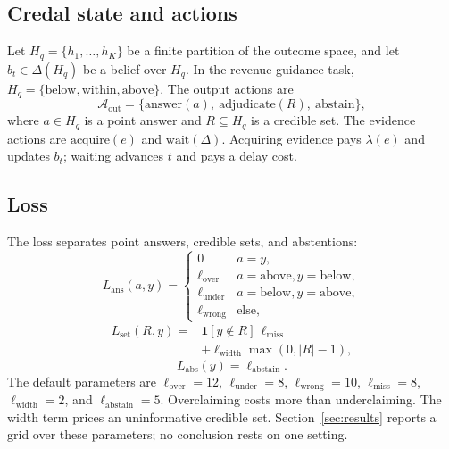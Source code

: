 \documentclass[11pt]{article}
\newcommand{\indic}{\mathbf{1}}
\begin{document}
\subsection{Credal state and actions}
Let $H_q=\{h_1,\dots,h_K\}$ be a finite partition of the outcome space, and let $b_t\in\Delta(H_q)$ be a belief over $H_q$. In the revenue-guidance task, $H_q=\{\text{below},\text{within},\text{above}\}$. The output actions are
\begin{equation}
\mathcal A_{\text{out}}=\{\text{answer}(a),\ \text{adjudicate}(R),\ \text{abstain}\},
\end{equation}
where $a\in H_q$ is a point answer and $R\subseteq H_q$ is a credible set. The evidence actions are $\text{acquire}(e)$ and $\text{wait}(\Delta)$. Acquiring evidence pays $\lambda(e)$ and updates $b_t$; waiting advances $t$ and pays a delay cost.

\subsection{Loss}
The loss separates point answers, credible sets, and abstentions:
\begin{equation}
L_{\text{ans}}(a,y)=
\begin{cases}
0 & a=y,\\
\ell_{\text{over}} & a=\text{above}, y=\text{below},\\
\ell_{\text{under}} & a=\text{below}, y=\text{above},\\
\ell_{\text{wrong}} & \text{else},
\end{cases}
\label{eq:answer-loss}
\end{equation}
\begin{equation}
\begin{split}
L_{\text{set}}(R,y)=&\indic[y\notin R]\,\ell_{\text{miss}}\\
&+\ell_{\text{width}}\max(0,|R|-1),
\end{split}
\label{eq:set-loss}
\end{equation}
\begin{equation}
L_{\text{abs}}(y)=\ell_{\text{abstain}}.
\label{eq:abstain-loss}
\end{equation}
The default parameters are $\ell_{\text{over}}=12$, $\ell_{\text{under}}=8$, $\ell_{\text{wrong}}=10$, $\ell_{\text{miss}}=8$, $\ell_{\text{width}}=2$, and $\ell_{\text{abstain}}=5$. Overclaiming costs more than underclaiming. The width term prices an uninformative credible set. Section~\ref{sec:results} reports a grid over these parameters; no conclusion rests on one setting.
\end{document}
